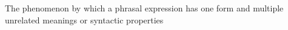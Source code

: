 The phenomenon by which a phrasal expression has one form and multiple unrelated meanings or syntactic properties
